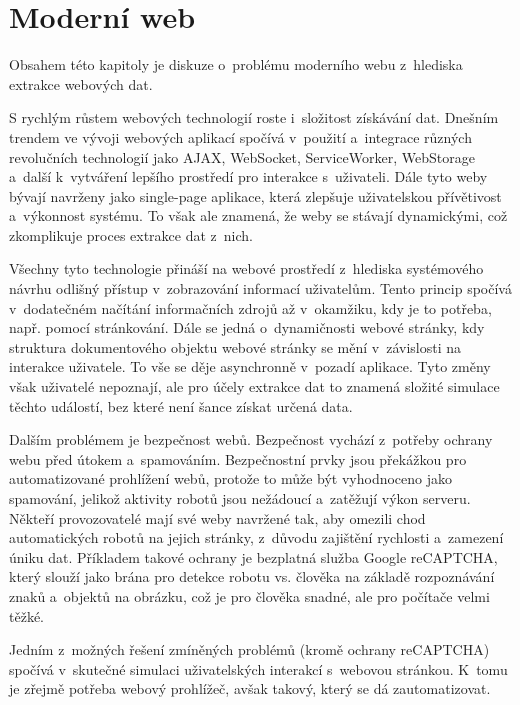 \documentclass[11pt,a4paper]{article}
\begin{document}
\section{Moderní web}
Obsahem této kapitoly je diskuze o~problému moderního webu z~hlediska extrakce webových dat.

S rychlým růstem webových technologií roste i~složitost získávání dat. Dnešním trendem ve vývoji webových aplikací spočívá v~použití a~integrace různých revolučních technologií jako AJAX, WebSocket, ServiceWorker, WebStorage a~další k~vytváření lepšího prostředí pro interakce s~uživateli. Dále tyto weby bývají navrženy jako single-page aplikace, která zlepšuje uživatelskou přívětivost a~výkonnost systému. To však ale znamená, že weby se stávají dynamickými, což zkomplikuje proces extrakce dat z~nich.

Všechny tyto technologie přináší na webové prostředí z~hlediska systémového návrhu odlišný přístup v~zobrazování informací uživatelům. Tento princip spočívá v~dodatečném načítání informačních zdrojů až v~okamžiku, kdy je to potřeba, např. pomocí stránkování. Dále se jedná o~dynamičnosti webové stránky, kdy struktura dokumentového objektu webové stránky se mění v~závislosti na interakce uživatele. To vše se děje asynchronně v~pozadí aplikace. Tyto změny však uživatelé nepoznají, ale pro účely extrakce dat to znamená složité simulace těchto událostí, bez které není šance získat určená data. 

Dalším problémem je bezpečnost webů. Bezpečnost vychází z~potřeby ochrany webu před útokem a~spamováním. Bezpečnostní prvky jsou překážkou pro automatizované prohlížení webů, protože to může být vyhodnoceno jako spamování, jelikož aktivity robotů jsou nežádoucí a~zatěžují výkon serveru. Někteří provozovatelé mají své weby navržené tak, aby omezili chod automatických robotů na jejich stránky, z~důvodu zajištění rychlosti a~zamezení úniku dat. Příkladem takové ochrany je bezplatná služba Google reCAPTCHA, který slouží jako brána pro detekce robotu vs. člověka na základě rozpoznávání znaků a~objektů na obrázku, což je pro člověka snadné, ale pro počítače velmi těžké.

Jedním z~možných řešení zmíněných problémů (kromě ochrany reCAPTCHA) spočívá v~skutečné simulaci uživatelských interakcí s~webovou stránkou. K~tomu je zřejmě potřeba webový prohlížeč, avšak takový, který se dá zautomatizovat.


\end{document}
